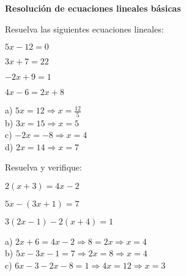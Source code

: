 \begin{exercise}
\textbf{Resolución de ecuaciones lineales básicas}

\problem Resuelva las siguientes ecuaciones lineales:
\begin{exerciselist}
    \item $5x - 12 = 0$
    \item $3x + 7 = 22$
    \item $-2x + 9 = 1$
    \item $4x - 6 = 2x + 8$
\end{exerciselist}

\begin{solucion}
a) $5x = 12 \Rightarrow x = \frac{12}{5}$\\
b) $3x = 15 \Rightarrow x = 5$\\
c) $-2x = -8 \Rightarrow x = 4$\\
d) $2x = 14 \Rightarrow x = 7$
\end{solucion}

\problem Resuelva y verifique:
\begin{exerciselist}
    \item $2(x + 3) = 4x - 2$
    \item $5x - (3x + 1) = 7$
    \item $3(2x - 1) - 2(x + 4) = 1$
\end{exerciselist}

\begin{solucion}
a) $2x + 6 = 4x - 2 \Rightarrow 8 = 2x \Rightarrow x = 4$\\
b) $5x - 3x - 1 = 7 \Rightarrow 2x = 8 \Rightarrow x = 4$\\
c) $6x - 3 - 2x - 8 = 1 \Rightarrow 4x = 12 \Rightarrow x = 3$
\end{solucion}
\end{exercise}

